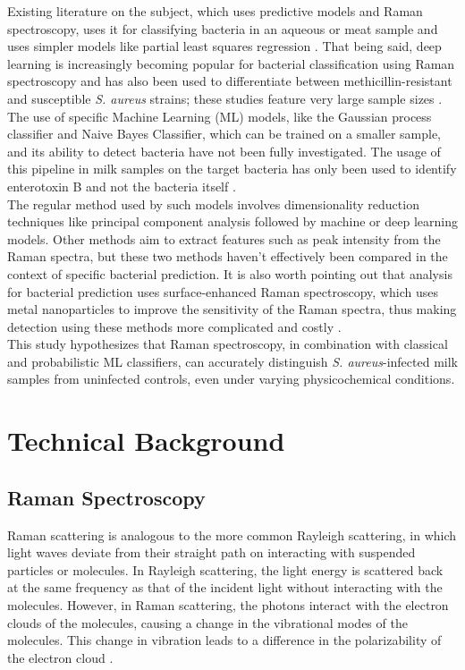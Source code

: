 \noindent Existing literature on the subject, which uses predictive models and Raman spectroscopy, uses it for classifying bacteria in an aqueous or meat sample and uses simpler models like partial least squares regression \cite{Klein2023,Smith2024}. That being said, deep learning is increasingly becoming popular for bacterial classification using Raman spectroscopy and has also been used to differentiate between methicillin-resistant and susceptible \textit{S. aureus} strains; these studies feature very large sample sizes \cite{Ho2019}. The use of specific Machine Learning (ML) models, like the Gaussian process classifier and Naive Bayes Classifier, which can be trained on a smaller sample, and its ability to detect bacteria have not been fully investigated. The usage of this pipeline in milk samples on the target bacteria has only been used to identify enterotoxin B and not the bacteria itself \cite{DoeJRS6296}. \\

\noindent The regular method used by such models involves dimensionality reduction techniques like principal component analysis followed by machine or deep learning models. Other methods aim to extract features such as peak intensity from the Raman spectra, but these two methods haven’t effectively been compared in the context of specific bacterial prediction. It is also worth pointing out that analysis for bacterial prediction uses surface-enhanced Raman spectroscopy, which uses metal nanoparticles to improve the sensitivity of the Raman spectra, thus making detection using these methods more complicated and costly \cite{DoeJRS6296}. \\

\noindent This study hypothesizes that Raman spectroscopy, in combination with classical and probabilistic ML classifiers, can accurately distinguish \textit{S. aureus}-infected milk samples from uninfected controls, even under varying physicochemical conditions.


\section{ Technical Background} \label{sec:setting}

\subsection{Raman Spectroscopy}

Raman scattering is analogous to the more common Rayleigh scattering, in which light waves deviate from their straight path on interacting with suspended particles or molecules. In Rayleigh scattering, the light energy is scattered back at the same frequency as that of the incident light without interacting with the molecules. However, in Raman scattering, the photons interact with the electron clouds of the molecules, causing a change in the vibrational modes of the molecules. This change in vibration leads to a difference in the polarizability of the electron cloud \cite{SciHub76e3755}. \\

